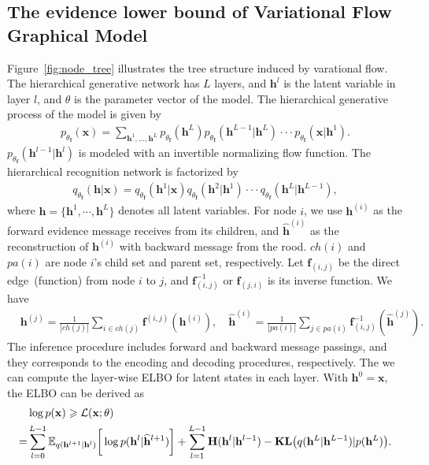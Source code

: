 \documentclass{article} %
\begin{document}
\subsection{The evidence lower bound of Variational Flow Graphical Model}
Figure~\ref{fig:node_tree} illustrates the tree structure induced by varational flow.  The hierarchical generative network has $L$ layers, and $\mathbf{h}^l$ is the latent variable in layer $l$, and $\theta$ is the parameter vector of the model. The hierarchical generative process of the model is given by 
\begin{align*}
p_{\theta_{\mathbf{f}}}(\mathbf{x}) = \sum_{\mathbf{h}^1, ..., \mathbf{h}^L} p_{\theta_{\mathbf{f}}}(\mathbf{h}^L)p_{\theta_{\mathbf{f}}}(\mathbf{h}^{L-1} | \mathbf{h}^{L}) \cdot \cdot  \cdot  p_{\theta_{\mathbf{f}}}(\mathbf{x} | \mathbf{h}^{1}) .
\end{align*}
$p_{\theta_{\mathbf{f}}}(\mathbf{h}^{l-1} | \mathbf{h}^{l})$ is modeled with an invertible normalizing flow function. The hierarchical recognition network is factorized by
\begin{align*}
q_{\theta_{\mathbf{f}}}(\mathbf{h}| \mathbf{x}) =  q_{\theta_{\mathbf{f}}}(\mathbf{h}^1 | \mathbf{x})  q_{\theta_{\mathbf{f}}}(\mathbf{h}^2 | \mathbf{h}^1) \cdot \cdot  \cdot  q_{\theta_{\mathbf{f}}}(\mathbf{h}^{L} | \mathbf{h}^{L-1}),
\end{align*}
where $\mathbf{h}=\{\mathbf{h}^1, \cdots, \mathbf{h}^L \}$ denotes all latent variables. For node $i$, we use $\mathbf{h}^{(i)}$ as the forward evidence message receives from its children, and $\widehat{\mathbf{h}}^{(i)}$ as the  reconstruction of $\mathbf{h}^{(i)}$ with backward message from the rood. $ch(i)$ and $pa(i)$ are node $i$'s child set and parent  set, respectively. Let $\mathbf{f}_{(i, j)}$ be the direct edge~(function) from node $i$  to  $j$, and $\mathbf{f}^{-1}_{ (i, j)}$ or  $\mathbf{f}_{ (j, i)}$  is its inverse function.  We have
\begin{align*}
&  \mathbf{h}^{(j)} = \frac{1}{|ch(j)|} \sum_{i \in ch(j) } \mathbf{f}^{(i,j)}(\mathbf{h}^{(i)}),  \quad \widehat{\mathbf{h}}^{(i)} = \frac{1}{|pa(i)|} \sum_{j \in pa(i) } \mathbf{f}^{-1}_{ (i,j)}(\widehat{\mathbf{h}}^{(j)}) .
\end{align*} 
The inference procedure includes forward and backward message passings, and they corresponds to the encoding and decoding procedures, respectively. The we can compute the layer-wise ELBO for latent states in each layer. With $\mathbf{h}^0 = \mathbf{x}$, the ELBO can be derived as 
\begin{align}  \notag
& \log p(\mathbf{x})  \geqslant \mathcal{L}(\mathbf{x}; \theta) \\
 = & \sum_{l=0}^{L-1}  \mathbb{E}_{q(\mathbf{h}^{l+1}|\mathbf{h}^l)} \bigg[ \log p( \mathbf{h}^{l}|  \widehat{\mathbf{h}}^{l+1})   \bigg] +  \sum_{l=1}^{L-1}   \textbf{\text{H}}(\mathbf{h}^l | \mathbf{h}^{l-1} )   -   \textbf{\text{KL}}\big(q(\mathbf{h}^L | \mathbf{h}^{L-1} )   | p(\mathbf{h}^L)  \big) .  \label{eq:elbo_tree}
\end{align}
\end{document}

